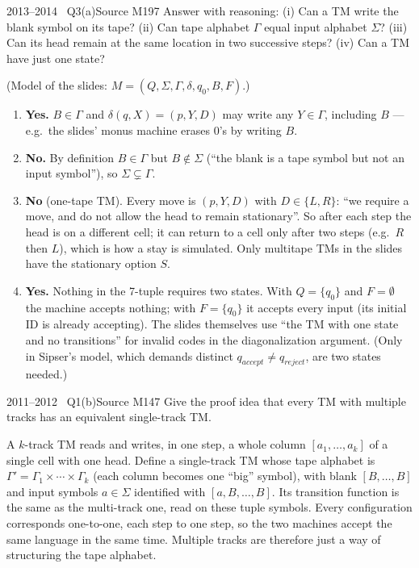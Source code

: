 \documentclass[11pt,a4paper]{article}
\begin{document}
\begin{question}{2013--2014 \textbullet\ Q3(a)}{Source M19}{7}
Answer with reasoning: (i) Can a TM write the blank symbol on its tape? (ii) Can tape alphabet $\Gamma$ equal input alphabet $\Sigma$? (iii) Can its head remain at the same location in two successive steps? (iv) Can a TM have just one state?
\end{question}
\begin{solution}
(Model of the slides: $M=(Q,\Sigma,\Gamma,\delta,q_0,B,F)$.)
\begin{enumerate}
\item \textbf{Yes.} $B\in\Gamma$ and $\delta(q,X)=(p,Y,D)$ may write any $Y\in\Gamma$, including $B$ --- e.g.\ the slides' monus machine erases 0's by writing $B$.
\item \textbf{No.} By definition $B\in\Gamma$ but $B\notin\Sigma$ (``the blank is a tape symbol but not an input symbol''), so $\Sigma\subsetneq\Gamma$.
\item \textbf{No} (one-tape TM). Every move is $(p,Y,D)$ with $D\in\{L,R\}$: ``we require a move, and do not allow the head to remain stationary''. So after each step the head is on a different cell; it can return to a cell only after two steps (e.g.\ $R$ then $L$), which is how a stay is simulated. Only multitape TMs in the slides have the stationary option $S$.
\item \textbf{Yes.} Nothing in the 7-tuple requires two states. With $Q=\{q_0\}$ and $F=\emptyset$ the machine accepts nothing; with $F=\{q_0\}$ it accepts every input (its initial ID is already accepting). The slides themselves use ``the TM with one state and no transitions'' for invalid codes in the diagonalization argument. (Only in Sipser's model, which demands distinct $q_{accept}\ne q_{reject}$, are two states needed.)
\end{enumerate}
\end{solution}

\begin{question}{2011--2012 \textbullet\ Q1(b)}{Source M14}{7}
Give the proof idea that every TM with multiple tracks has an equivalent single-track TM.
\end{question}
\begin{solution}
A $k$-track TM reads and writes, in one step, a whole column $[a_1,\dots,a_k]$ of a single cell with one head. Define a single-track TM whose tape alphabet is $\Gamma'=\Gamma_1\times\cdots\times\Gamma_k$ (each column becomes one ``big'' symbol), with blank $[B,\dots,B]$ and input symbols $a\in\Sigma$ identified with $[a,B,\dots,B]$. Its transition function is the same as the multi-track one, read on these tuple symbols. Every configuration corresponds one-to-one, each step to one step, so the two machines accept the same language in the same time. Multiple tracks are therefore just a way of structuring the tape alphabet.
\end{solution}
\end{document}
